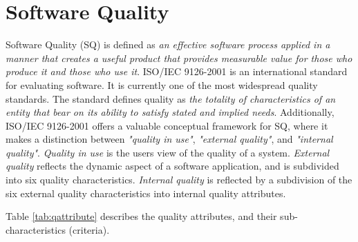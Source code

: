 \section{Software Quality}
\label{sec:2-SQ}
Software Quality (SQ) is defined as \textit{an effective software process applied in a manner that creates a useful product that provides measurable value for those who produce it and those who use it}\cite{Pressman:2009:SEP:1593949}. ISO/IEC 9126-2001 is an international standard for evaluating software\cite{ISOIEC9126}. It is currently one of the most widespread quality standards\cite{trienekens2010quality}. The standard defines quality as \textit{the totality of characteristics of an entity that bear on its ability to satisfy stated and implied needs}. Additionally, ISO/IEC 9126-2001 offers a valuable conceptual framework for SQ, where it makes a distinction between \textit{"quality in use"}, \textit{"external quality"}, and \textit{"internal quality"}\cite{ISOIEC9126,trienekens2010quality}. \textit{Quality in use} is the users view of the quality of a system. \textit{External quality} reflects the dynamic aspect of a software application, and is subdivided into six quality characteristics. \textit{Internal quality} is reflected by a subdivision of the six external quality characteristics into internal quality attributes.

Table \ref{tab:qattribute} describes the quality attributes, and their sub-characteristics (criteria).

